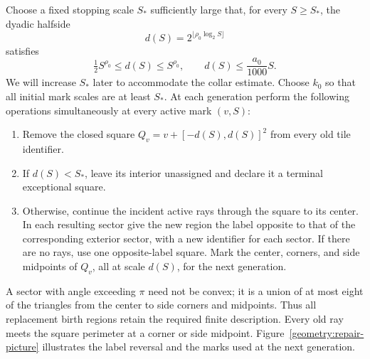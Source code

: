 Choose a fixed stopping scale $S_*$ sufficiently large that, for every
$S\ge S_*$, the dyadic halfside
\begin{equation}
\label{geometry:trim-radius}
 d(S)=2^{\lfloor\rho_0\log_2 S\rfloor}
\end{equation}
satisfies
\begin{equation}
\label{geometry:trim-margins}
 \tfrac12S^{\rho_0}\le d(S)\le S^{\rho_0},\qquad
 d(S)\le\frac{a_0}{1000}S.
\end{equation}
We will increase $S_*$ later to accommodate the collar estimate.  Choose
$k_0$ so that all initial mark scales are at least $S_*$.  At each
generation perform the following operations simultaneously at every
active mark $(v,S)$:
\begin{enumerate}
\item
Remove the closed square
$Q_v=v+[-d(S),d(S)]^2$ from every old tile identifier.
\item
If $d(S)<S_*$, leave its interior unassigned and declare it a terminal
exceptional square.
\item
Otherwise, continue the incident active rays through the square to its
center.  In each resulting sector give the new region the label opposite
to that of the corresponding exterior sector, with a new identifier for
each sector.  If there are no rays, use one opposite-label square.  Mark
the center, corners, and side midpoints of $Q_v$, all at scale $d(S)$,
for the next generation.
\end{enumerate}
A sector with angle exceeding $\pi$ need not be convex; it is a union of
at most eight of the triangles from the center to side corners and
midpoints.  Thus all replacement birth regions retain the required
finite description.  Every old ray meets the square perimeter at a
corner or side midpoint.  Figure~\ref{geometry:repair-picture} illustrates
the label reversal and the marks used at the next generation.

